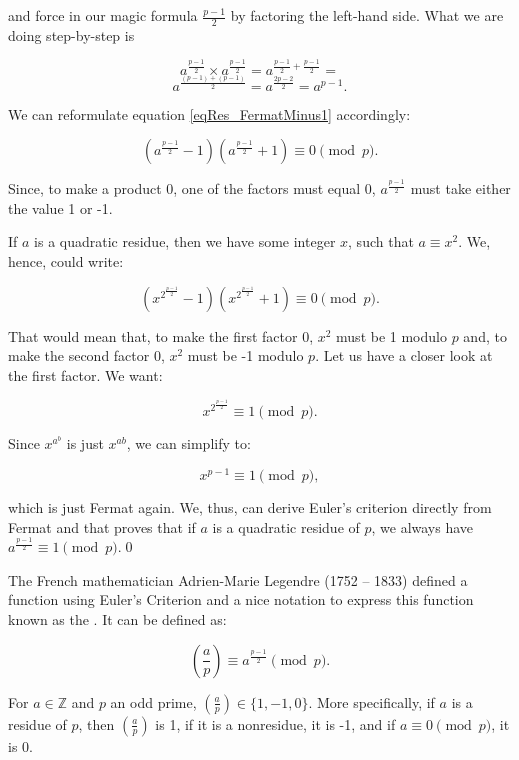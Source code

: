 \documentclass{scrreprt}
\begin{document}
and force in our magic formula $\frac{p-1}{2}$
by factoring the left-hand side.
What we are doing step-by-step is

\[
a^{\frac{p-1}{2}} \times a^{\frac{p-1}{2}} = a^{\frac{p-1}{2} + \frac{p-1}{2}} =
\]
\[
a^{\frac{(p-1) + (p-1)}{2}} = a^{\frac{2p-2}{2}} = a^{p-1}.
\]

We can reformulate equation \ref{eqRes_FermatMinus1} accordingly: 

\begin{equation} 
(a^{\frac{p-1}{2}} - 1) (a^{\frac{p-1}{2}} + 1) \equiv 0 \pmod{p}.
\end{equation} 

Since, to make a product 0, 
one of the factors must equal 0,
$a^{\frac{p-1}{2}}$ must take either the value 1 or -1.

If $a$ is a quadratic residue, then we have some integer $x$,
such that $a \equiv x^2$. 
We, hence, could write:

\begin{equation} 
(x^{2^{\frac{p-1}{2}}} - 1) (x^{2^{\frac{p-1}{2}}} + 1) \equiv 0 \pmod{p}.
\end{equation} 

That would mean that, to make the first factor 0,
$x^2$ must be 1 modulo $p$ and, to make the second factor 0,
$x^2$ must be -1 modulo $p$.
Let us have a closer look at the first factor. We want:

\[
x^{2^{\frac{p-1}{2}}} \equiv 1 \pmod{p}.
\]

Since $x^{a^b}$ is just $x^{ab}$, we can simplify to:

\[
x^{p-1} \equiv 1 \pmod{p},
\]

which is just Fermat again.
We, thus, can derive Euler's criterion
directly from Fermat and that proves that 
if $a$ is a quadratic residue of $p$, 
we always have
$a^{\frac{p-1}{2}} \equiv 1 \pmod{p}$.\qed

The French mathematician Adrien-Marie Legendre (1752 -- 1833)
defined a function using Euler's Criterion
and a nice notation to express this function
known as the .
It can be defined as:

\begin{equation}
\left(\frac{a}{p}\right) \equiv a^{\frac{p-1}{2}} \pmod{p}.
\end{equation}

For $a \in \mathbb{Z}$ and $p$ an odd prime,
$\left(\frac{a}{p}\right) \in \lbrace 1,-1,0\rbrace$.
More specifically, if $a$ is a residue of $p$,
then $\left(\frac{a}{p}\right)$ is 1,
if it is a nonresidue, it is -1, and if $a \equiv 0 \pmod{p}$,
it is 0.
\end{document}
